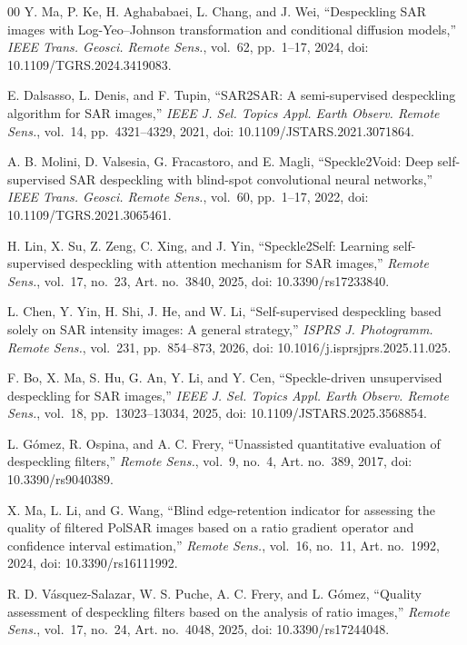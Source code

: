 \documentclass[conference]{IEEEtran}
\begin{document}
\begin{thebibliography}{00}
Y. Ma, P. Ke, H. Aghababaei, L. Chang, and J. Wei, ``Despeckling SAR images with Log-Yeo--Johnson transformation and conditional diffusion models,'' \emph{IEEE Trans. Geosci. Remote Sens.}, vol.~62, pp.~1--17, 2024, doi: 10.1109/TGRS.2024.3419083.

E. Dalsasso, L. Denis, and F. Tupin, ``SAR2SAR: A semi-supervised despeckling algorithm for SAR images,'' \emph{IEEE J. Sel. Topics Appl. Earth Observ. Remote Sens.}, vol.~14, pp.~4321--4329, 2021, doi: 10.1109/JSTARS.2021.3071864.

A. B. Molini, D. Valsesia, G. Fracastoro, and E. Magli, ``Speckle2Void: Deep self-supervised SAR despeckling with blind-spot convolutional neural networks,'' \emph{IEEE Trans. Geosci. Remote Sens.}, vol.~60, pp.~1--17, 2022, doi: 10.1109/TGRS.2021.3065461.

H. Lin, X. Su, Z. Zeng, C. Xing, and J. Yin, ``Speckle2Self: Learning self-supervised despeckling with attention mechanism for SAR images,'' \emph{Remote Sens.}, vol.~17, no.~23, Art. no.~3840, 2025, doi: 10.3390/rs17233840.

L. Chen, Y. Yin, H. Shi, J. He, and W. Li, ``Self-supervised despeckling based solely on SAR intensity images: A general strategy,'' \emph{ISPRS J. Photogramm. Remote Sens.}, vol.~231, pp.~854--873, 2026, doi: 10.1016/j.isprsjprs.2025.11.025.

F. Bo, X. Ma, S. Hu, G. An, Y. Li, and Y. Cen, ``Speckle-driven unsupervised despeckling for SAR images,'' \emph{IEEE J. Sel. Topics Appl. Earth Observ. Remote Sens.}, vol.~18, pp.~13023--13034, 2025, doi: 10.1109/JSTARS.2025.3568854.

L. G\'omez, R. Ospina, and A. C. Frery, ``Unassisted quantitative evaluation of despeckling filters,'' \emph{Remote Sens.}, vol.~9, no.~4, Art. no.~389, 2017, doi: 10.3390/rs9040389.

X. Ma, L. Li, and G. Wang, ``Blind edge-retention indicator for assessing the quality of filtered PolSAR images based on a ratio gradient operator and confidence interval estimation,'' \emph{Remote Sens.}, vol.~16, no.~11, Art. no.~1992, 2024, doi: 10.3390/rs16111992.

R. D. V\'asquez-Salazar, W. S. Puche, A. C. Frery, and L. G\'omez, ``Quality assessment of despeckling filters based on the analysis of ratio images,'' \emph{Remote Sens.}, vol.~17, no.~24, Art. no.~4048, 2025, doi: 10.3390/rs17244048.


\end{thebibliography}
\end{document}
